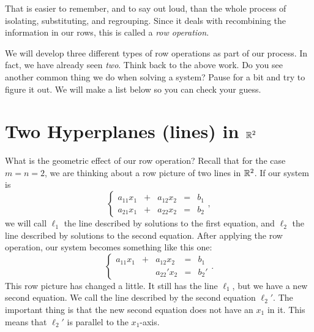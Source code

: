 \documentclass[00-livre-main.tex]{subfiles}
\begin{document}
That is easier to remember, and to say out loud, than the whole process of isolating, substituting, and regrouping. Since it deals with recombining the information in our rows, this is called a \emph{row operation}.

We will develop three different types of row operations as part of our process. In fact, we have already seen \emph{two}. Think back to the above work. Do you see another common thing we do when solving a system? Pause for a bit and try to figure it out. We will make a list below so you can check your guess.


\section*{Two Hyperplanes (lines) in $\mathbb{R}^2$}

What is the geometric effect of our row operation? Recall that for the case $m=n=2$, we are thinking about a row picture of two lines in $\mathbb{R}^2$. If our system is
\[
\left\{ \begin{array}{rrrrr}
a_{11}x_1 & + & a_{12}x_2 & = & b_1 \\
a_{21}x_1 & + & a_{22}x_2 & = & b_2
\end{array}\right. ,
\]
we will call $\ell_1$ the line described by solutions to the first equation, and $\ell_2$ the line described by solutions to the second equation. After applying the row operation, our system becomes something like this one:
\[
\left\{ \begin{array}{rrrrr}
a_{11}x_1 & + & a_{12}x_2 & = & b_1 \\
& & a_{22}' x_2 & = & b_2'
\end{array}\right. .
\]
This row picture has changed a little. It still has the line $\ell_1$, but we have a new second equation. We call the line described by the second equation $\ell_2'$.  The important thing is that the new second equation does not have an $x_1$ in it. This means that $\ell_2'$ is parallel to the $x_1$-axis.
\end{document}

